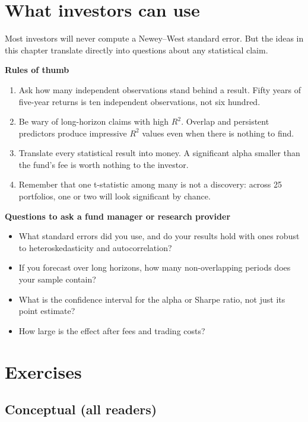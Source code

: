 \section{What investors can use}
\label{sec:03-investors}

Most investors will never compute a Newey--West standard error. But the ideas in this chapter translate directly into questions about any statistical claim.

\textbf{Rules of thumb}

\begin{enumerate}
  \item Ask how many independent observations stand behind a result. Fifty years of five-year returns is ten independent observations, not six hundred.
  \item Be wary of long-horizon claims with high $R^2$. Overlap and persistent predictors produce impressive $R^2$ values even when there is nothing to find.
  \item Translate every statistical result into money. A significant alpha smaller than the fund's fee is worth nothing to the investor.
  \item Remember that one t-statistic among many is not a discovery: across 25 portfolios, one or two will look significant by chance.
\end{enumerate}

\textbf{Questions to ask a fund manager or research provider}

\begin{itemize}
  \item What standard errors did you use, and do your results hold with ones robust to heteroskedasticity and autocorrelation?
  \item If you forecast over long horizons, how many non-overlapping periods does your sample contain?
  \item What is the confidence interval for the alpha or Sharpe ratio, not just its point estimate?
  \item How large is the effect after fees and trading costs?
\end{itemize}

\section*{Exercises}

\subsection*{Conceptual (all readers)}

